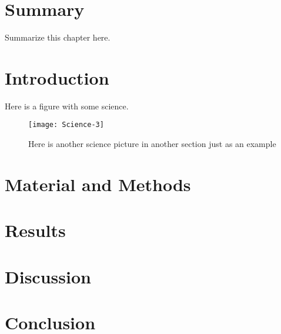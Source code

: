 \section{Summary}
Summarize this chapter here. 

\section{Introduction}

Here is a figure with some science. 

\begin{figure}[h]
\texttt{[image: Science-3]}
\caption[Cool science picture 3]{Here is another science picture in another section just as an example}
\centering
\label{fig:Science-1}
\end{figure}

\section{Material and Methods}

 

\section{Results}


\section{Discussion}



\section{Conclusion}



\clearpage
